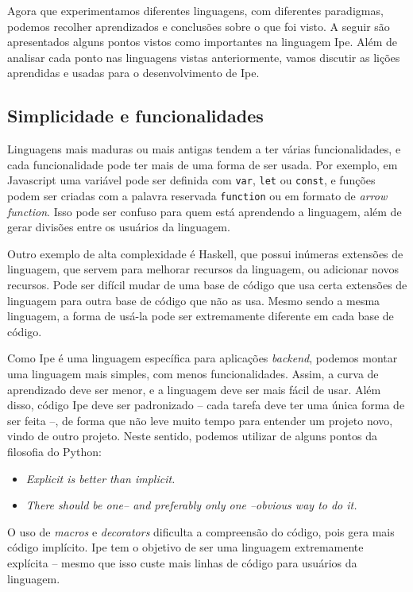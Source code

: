 Agora que experimentamos diferentes linguagens, com diferentes paradigmas, podemos
recolher aprendizados e conclusões sobre o que foi visto. A seguir são apresentados
alguns pontos vistos como importantes na linguagem Ipe. Além de analisar cada ponto
nas linguagens vistas anteriormente, vamos discutir as lições aprendidas e usadas
para o desenvolvimento de Ipe.

\subsection{Simplicidade e funcionalidades}

Linguagens mais maduras ou mais antigas tendem a ter várias funcionalidades, e
cada funcionalidade pode ter mais de uma forma de ser usada. Por exemplo, em
Javascript uma variável pode ser definida com \texttt{var}, \texttt{let} ou
\texttt{const}, e funções podem ser criadas com a palavra reservada \texttt{function}
ou em formato de \textit{arrow function}. Isso pode ser confuso para quem está
aprendendo a linguagem, além de gerar divisões entre os usuários da linguagem.

Outro exemplo de alta complexidade é Haskell, que possui inúmeras extensões de
linguagem, que servem para melhorar recursos da linguagem, ou adicionar novos
recursos. Pode ser difícil mudar de uma base de código que usa certa extensões
de linguagem para outra base de código que não as usa. Mesmo sendo a mesma linguagem,
a forma de usá-la pode ser extremamente diferente em cada base de código.

Como Ipe é uma linguagem específica para aplicações \textit{backend}, podemos
montar uma linguagem mais simples, com menos funcionalidades. Assim, a curva de
aprendizado deve ser menor, e a linguagem deve ser mais fácil de usar. Além disso,
código Ipe deve ser padronizado -- cada tarefa deve ter uma única forma de ser feita --,
de forma que não leve muito tempo para entender um projeto novo, vindo de outro projeto.
Neste sentido, podemos utilizar de alguns pontos da filosofia do Python:

\begin{itemize}
    \item \textit{Explicit is better than implicit.}
    \item \textit{There should be one-- and preferably only one --obvious way to do it.}
\end{itemize}

\cite{zenofpython}

O uso de \textit{macros} e \textit{decorators} dificulta a compreensão do código,
pois gera mais código implícito. Ipe tem o objetivo de ser uma linguagem extremamente
explícita -- mesmo que isso custe mais linhas de código para usuários da linguagem.

